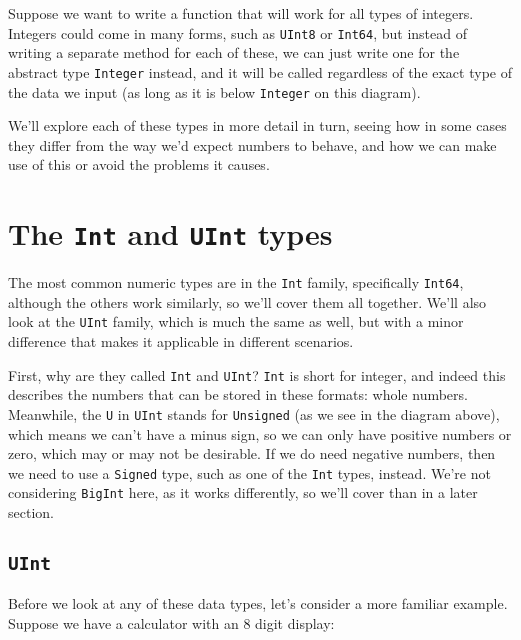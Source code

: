 \documentclass[
  letterpaper,
  DIV=11,
  numbers=noendperiod]{scrreprt}
\begin{document}
Suppose we want to write a function that will work for all types of
integers. Integers could come in many forms, such as \texttt{UInt8} or
\texttt{Int64}, but instead of writing a separate method for each of
these, we can just write one for the abstract type \texttt{Integer}
instead, and it will be called regardless of the exact type of the data
we input (as long as it is below \texttt{Integer} on this diagram).

We'll explore each of these types in more detail in turn, seeing how in
some cases they differ from the way we'd expect numbers to behave, and
how we can make use of this or avoid the problems it causes.

\hypertarget{the-int-and-uint-types}{%
\section{\texorpdfstring{The \texttt{Int} and \texttt{UInt}
types}{The Int and UInt types}}\label{the-int-and-uint-types}}

The most common numeric types are in the \texttt{Int} family,
specifically \texttt{Int64}, although the others work similarly, so
we'll cover them all together. We'll also look at the \texttt{UInt}
family, which is much the same as well, but with a minor difference that
makes it applicable in different scenarios.

First, why are they called \texttt{Int} and \texttt{UInt}? \texttt{Int}
is short for integer, and indeed this describes the numbers that can be
stored in these formats: whole numbers. Meanwhile, the \texttt{U} in
\texttt{UInt} stands for \texttt{Unsigned} (as we see in the diagram
above), which means we can't have a minus sign, so we can only have
positive numbers or zero, which may or may not be desirable. If we do
need negative numbers, then we need to use a \texttt{Signed} type, such
as one of the \texttt{Int} types, instead. We're not considering
\texttt{BigInt} here, as it works differently, so we'll cover than in a
later section.

\hypertarget{uint}{%
\subsection{\texorpdfstring{\texttt{UInt}}{UInt}}\label{uint}}

Before we look at any of these data types, let's consider a more
familiar example. Suppose we have a calculator with an 8 digit display:
\end{document}
